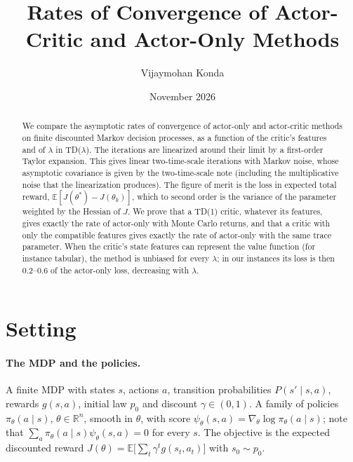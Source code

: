 \documentclass[11pt]{article}
\title{Rates of Convergence of Actor-Critic and Actor-Only Methods}
\author{Vijaymohan Konda}
\date{November 2026}
\theoremstyle{definition}
\theoremstyle{remark}
\newcommand{\R}{\mathbb{R}}
\newcommand{\E}{\mathbb{E}}
\begin{document}
\maketitle

\begin{abstract}
We compare the asymptotic rates of convergence of actor-only and actor-critic methods on
finite discounted Markov decision processes, as a function of the critic's features and of
$\lambda$ in TD($\lambda$). The iterations are linearized around their limit by a first-order
Taylor expansion. This gives linear two-time-scale iterations with Markov noise, whose
asymptotic covariance is given by the two-time-scale note (including the multiplicative noise
that the linearization produces). The figure of merit is the loss in expected total reward,
$\E[J(\theta^*) - J(\theta_k)]$, which to second order is the variance of the parameter weighted
by the Hessian of $J$. We prove that a TD(1) critic, whatever its features, gives exactly the rate
of actor-only with Monte Carlo returns, and that a critic with only the compatible features gives
exactly the rate of actor-only with the same trace parameter. When the critic's state features can represent the value function
(for instance tabular), the method is unbiased for every $\lambda$; in our instances its loss is then
0.2--0.6 of the actor-only loss, decreasing with $\lambda$.
\end{abstract}

\tableofcontents

\section{Setting}

\paragraph{The MDP and the policies.} A finite MDP with states $s$, actions $a$, transition
probabilities $P(s'\mid s,a)$, rewards $g(s,a)$, initial law $p_0$ and discount $\gamma \in (0,1)$.
A family of policies $\pi_\theta(a\mid s)$, $\theta \in \R^n$, smooth in $\theta$, with score
$\psi_\theta(s,a) = \nabla_\theta\log\pi_\theta(a\mid s)$; note that
$\sum_a\pi_\theta(a\mid s)\psi_\theta(s,a) = 0$ for every $s$. The objective is the expected
discounted reward $J(\theta) = \E\big[\sum_t\gamma^tg(s_t,a_t)\big]$ with $s_0 \sim p_0$.
\end{document}
